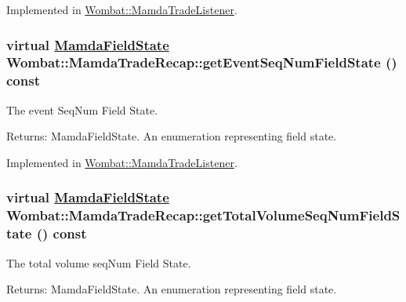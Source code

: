 Implemented in \hyperlink{classWombat_1_1MamdaTradeListener_61a7251329f3b6425a917dc2f95a8759}{Wombat::Mamda\-Trade\-Listener}.\hypertarget{classWombat_1_1MamdaTradeRecap_13ffda2f1178cc9c6297b3624d0b9912}{
\subsubsection[getEventSeqNumFieldState]{\setlength{\rightskip}{0pt plus 5cm}virtual \hyperlink{namespaceWombat_93aac974f2ab713554fd12a1fa3b7d2a}{Mamda\-Field\-State} Wombat::Mamda\-Trade\-Recap::get\-Event\-Seq\-Num\-Field\-State () const}}
\label{classWombat_1_1MamdaTradeRecap_13ffda2f1178cc9c6297b3624d0b9912}


The event Seq\-Num Field State. 

\begin{Desc}
\item[Returns:]Mamda\-Field\-State. An enumeration representing field state. \end{Desc}


Implemented in \hyperlink{classWombat_1_1MamdaTradeListener_22fb35889eb20ecd6e52d01d5227a74c}{Wombat::Mamda\-Trade\-Listener}.\hypertarget{classWombat_1_1MamdaTradeRecap_6a0c576b7c4902e34d3b144cc7120ec4}{
\subsubsection[getTotalVolumeSeqNumFieldState]{\setlength{\rightskip}{0pt plus 5cm}virtual \hyperlink{namespaceWombat_93aac974f2ab713554fd12a1fa3b7d2a}{Mamda\-Field\-State} Wombat::Mamda\-Trade\-Recap::get\-Total\-Volume\-Seq\-Num\-Field\-State () const}}
\label{classWombat_1_1MamdaTradeRecap_6a0c576b7c4902e34d3b144cc7120ec4}


The total volume seq\-Num Field State. 

\begin{Desc}
\item[Returns:]Mamda\-Field\-State. An enumeration representing field state. \end{Desc}


